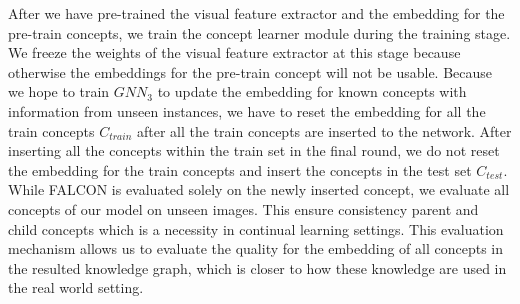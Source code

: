 After we have pre-trained the visual feature extractor and the embedding for the pre-train concepts,  we train the concept learner module during the training stage. 
We freeze the weights of the visual feature extractor at this stage because otherwise the embeddings for the pre-train concept will not be usable. 
Because we hope to train $GNN_3$ to update the embedding for known concepts with information from unseen instances, we have to reset the embedding for all the train concepts $C_{train}$ after all the train concepts are inserted to the network.
After inserting all the concepts within the train set in the final round, we do not reset the embedding for the train concepts and insert the concepts in the test set $C_{test}$. 
While FALCON is evaluated solely on the newly inserted concept, we evaluate all concepts of our model on unseen images. This ensure consistency parent and child concepts which is a necessity in continual learning settings. 
This evaluation mechanism allows us to evaluate the quality for the embedding of all concepts in the resulted knowledge graph, which is closer to how these knowledge are used in the real world setting. 





